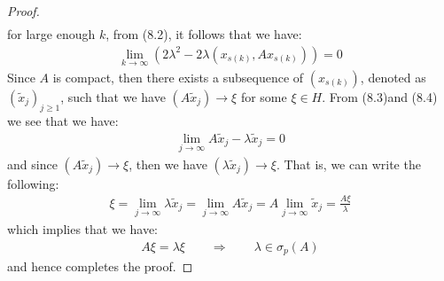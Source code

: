 \documentclass[11pt]{book}
\theoremstyle{break}
\theoremstyle{break}
\newcommand{\that}[1]{\widetilde{#1}}
\begin{document}
\begin{proof}
\begin{align}
\end{align}
for large enough $k$, from (8.2), it follows that we have:
\begin{align}
\lim_{k \to \infty}\left( 2\lambda^2 - 2\lambda (x_{s(k)}, Ax_{s(k)})\right) = 0
\end{align}
Since $A$ is compact, then there exists a subsequence of $(x_{s(k)})$, denoted as $(\that{x}_j)_{j\geq 1}$, such that we have $(A\that{x}_{j}) \to \xi$ for some $\xi\in H$. From (8.3)and (8.4) we see that we have:
\begin{align*}
\lim_{j\to \infty}A\that{x}_j - \lambda \that{x}_j = 0
\end{align*}
and since $(A\that{x}_j)\to \xi$, then we have $(\lambda \that{x}_j) \to \xi$. That is, we can write the following:
\begin{align*}
\xi = \lim_{j\to \infty}\lambda \that{x}_j = \lim_{j\to \infty}A\that{x}_j = A\lim_{j\to \infty}\that{x}_j = \frac{A\xi}{\lambda}
\end{align*}
which implies that we have:
\begin{align*}
A\xi = \lambda\xi \qquad \Rightarrow \qquad \lambda \in \sigma_p(A)
\end{align*}
and hence completes the proof. 
\end{proof}
\end{document}
